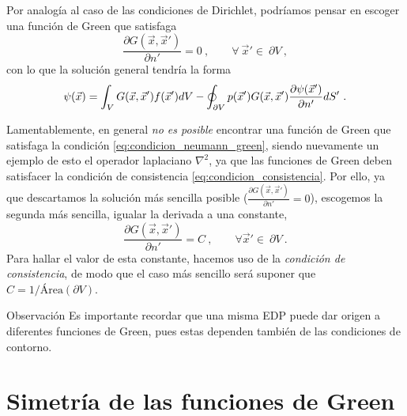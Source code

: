 Por analogía al caso de las condiciones de Dirichlet, podríamos pensar en escoger una función de Green que satisfaga
\begin{equation} \label{eq:condicion_neumann_green}
    \frac{\partial G(\vec{x}, \vec{x}')}{\partial n'} = 0 \ , \qquad \forall \ \vec{x}' \in \ \partial V \ ,
\end{equation}
con lo que la solución general tendría la forma
\begin{equation}
    \psi(\vec{x}) = \int_V G(\vec{x}, \vec{x}') f(\vec{x}') dV - \oint_{\partial V} p(\vec{x} ') G(\vec{x}, \vec{x}') \frac{\partial \psi(\vec{x}')}{\partial n'} dS' \ .
\end{equation}

Lamentablemente, en general \emph{no es posible} encontrar una función de Green que satisfaga la condición \eqref{eq:condicion_neumann_green}, siendo nuevamente un ejemplo de esto el operador laplaciano $\nabla^2$, ya que las funciones de Green deben satisfacer la condición de consistencia \eqref{eq:condicion_consistencia}. Por ello, ya que descartamos la solución más sencilla posible ($\frac{\partial G(\vec{x}, \vec{x}')}{\partial n'} = 0$), escogemos la segunda más sencilla, igualar la derivada a una constante,
\begin{equation}
    \frac{\partial G(\vec{x}, \vec{x}')}{\partial n'} = C \ , \qquad \forall \vec{x}' \in \ \partial V \ .
\end{equation}
Para hallar el valor de esta constante, hacemos uso de la \emph{condición de consistencia}, de modo que el caso más sencillo será suponer que $C = 1/\text{Área}(\partial V)$.



\begin{obs}{Observación}
    Es importante recordar que una misma EDP puede dar origen a diferentes funciones de Green, pues estas dependen también de las condiciones de contorno.
\end{obs}


\section{Simetría de las funciones de Green}

